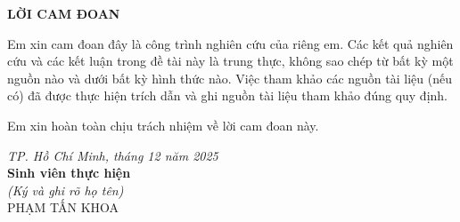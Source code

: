 \newpage
\thispagestyle{empty}
\begin{center}
{\LARGE \textbf{LỜI CAM ĐOAN}}
\end{center}

\vspace{2cm}

Em xin cam đoan đây là công trình nghiên cứu của riêng em. Các kết quả nghiên cứu và các kết luận trong đề tài này là trung thực, không sao chép từ bất kỳ một nguồn nào và dưới bất kỳ hình thức nào. Việc tham khảo các nguồn tài liệu (nếu có) đã được thực hiện trích dẫn và ghi nguồn tài liệu tham khảo đúng quy định.

Em xin hoàn toàn chịu trách nhiệm về lời cam đoan này.

\vspace{3cm}

\begin{flushright}
\textit{TP. Hồ Chí Minh, tháng 12 năm 2025} \\
\vspace{0.5cm}
\textbf{Sinh viên thực hiện} \\
\vspace{2cm}
\textit{(Ký và ghi rõ họ tên)} \\
\vspace{0.5cm}
PHẠM TẤN KHOA
\end{flushright}

